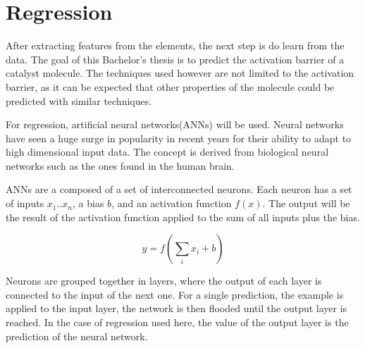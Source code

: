 
\chapter{Regression}
\label{ch:Regression}

After extracting features from the elements, the next step is do learn from the data.
The goal of this Bachelor's thesis is to predict the activation barrier of a catalyst molecule.
The techniques used however are not limited to the activation barrier, 
as it can be expected that other properties of the molecule could be predicted with similar techniques.

For regression, artificial neural networks(ANNs) will be used.
Neural networks have seen a huge surge in popularity in recent years for their ability to 
adapt to high dimensional input data.
The concept is derived from biological neural networks such as the ones found in the human brain.

ANNs are a composed of a set of interconnected neurons.
Each neuron has a set of inputs $x_1 .. x_n$, a bias $b$, and an activation function $f(x)$.
The output will be the result of the activation function applied to the sum of all inputs plus the bias.

$$ y = f \left( \sum_i x_i + b \right) $$

Neurons are grouped together in layers, where the output of each layer is connected to the input of the next one.
For a single prediction, the example is applied to the input layer, the network is then flooded until the output layer is reached.
In the case of regression used here, the value of the output layer is the prediction of the neural network.

